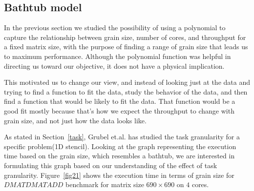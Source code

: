 \subsection{Bathtub model}
In the previous section we studied the possibility of using a polynomial to capture the relationship between grain size, number of cores, and throughput for a fixed matrix size, with the purpose of finding a range of grain size that leads us to maximum performance. 
Although the polynomial function was helpful in directing us toward our objective, it does not have a physical implication. 

This motivated us to change our view, and instead of looking just at the data and trying to find a function to fit the data, study the behavior of the data, and then find a function that would be likely to fit the data. That function would be a good fit mostly because that's how we expect the throughput to change with grain size, and not just how the data looks like.   

As stated in Section~\ref{task}, Grubel et.al.\cite{grubel2015performance} has studied the task granularity for a specific problem(1D stencil). Looking at the graph representing the execution time based on the grain size, which resembles a bathtub, we are interested in formulating this graph based on our understanding of the effect of task granularity. Figure~\ref{fig21} shows the execution time in terms of grain size for $DMATDMATADD$ benchmark for matrix size $690\times690$ on $4$ cores.


